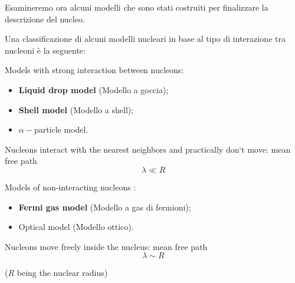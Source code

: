 Esamineremo ora alcuni modelli che sono stati costruiti per finalizzare la descrizione del nucleo.

Una classificazione di alcuni modelli nucleari in base al tipo di interazione tra nucleoni è la seguente:
\begin{multicols}{2}
	\begin{center}
		Models with strong interaction between nucleons:
	\end{center}
	\begin{itemize}
		\item \textbf{Liquid drop model} (Modello a goccia);
		\item \textbf{Shell model} (Modello a shell);
		\item $ \alpha-$particle model.
	\end{itemize}
   \begin{center}
	   Nucleons interact with the nearest neighbors and practically don‘t move: mean free path \[ \lambda \ll R\]
   \end{center}
	\columnbreak

	\begin{center}
		Models of non-interacting nucleons :
	\end{center}
	\begin{itemize}
		\item \textbf{Fermi gas model} (Modello a gas di fermioni);
		\item Optical model (Modello ottico).
	\end{itemize}
	\begin{center}
		Nucleons move freely inside the nucleus: mean free path \[ \lambda \sim R\]
	\end{center}
\end{multicols}
\begin{center}
($ R$ being the nuclear radius)
\end{center}
